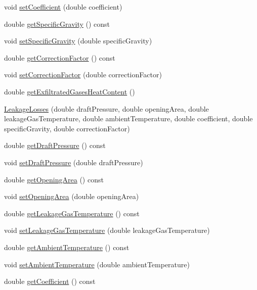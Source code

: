 \begin{DoxyCompactItemize}
void \hyperlink{class_leakage_losses_add2e96e75b6dd965370340dc03717434}{set\+Coefficient} (double coefficient)
\item 
double \hyperlink{class_leakage_losses_a37cd8c2282547246bab395424dad51d9}{get\+Specific\+Gravity} () const
\item 
void \hyperlink{class_leakage_losses_ab017828413655c5903374564e8718fac}{set\+Specific\+Gravity} (double specific\+Gravity)
\item 
double \hyperlink{class_leakage_losses_ad4f289a7490cd3fd4dfc4099fc4ad562}{get\+Correction\+Factor} () const
\item 
void \hyperlink{class_leakage_losses_a1af53750d5d9573dffa8674b3479e8d6}{set\+Correction\+Factor} (double correction\+Factor)
\item 
double \hyperlink{class_leakage_losses_a9663b916752bcf39a5482674e225e4a5}{get\+Exfiltrated\+Gases\+Heat\+Content} ()
\item 
\hyperlink{class_leakage_losses_ab29a3d7c9561d73f2530fc376b528510}{Leakage\+Losses} (double draft\+Pressure, double opening\+Area, double leakage\+Gas\+Temperature, double ambient\+Temperature, double coefficient, double specific\+Gravity, double correction\+Factor)
\item 
double \hyperlink{class_leakage_losses_a0ec89fc6371c4a788e1bb861c7cfba35}{get\+Draft\+Pressure} () const
\item 
void \hyperlink{class_leakage_losses_a33f31dc336fc6af0fd1e8c8739f37b1a}{set\+Draft\+Pressure} (double draft\+Pressure)
\item 
double \hyperlink{class_leakage_losses_a6b31fbefaa16a5a52ce423b9531e84fa}{get\+Opening\+Area} () const
\item 
void \hyperlink{class_leakage_losses_a417c9914af6b283695bdbd5e92451f9e}{set\+Opening\+Area} (double opening\+Area)
\item 
double \hyperlink{class_leakage_losses_a5dbb249c07bc91611b71d62610af7234}{get\+Leakage\+Gas\+Temperature} () const
\item 
void \hyperlink{class_leakage_losses_a379c88c8dea822636a1b9966e2408daa}{set\+Leakage\+Gas\+Temperature} (double leakage\+Gas\+Temperature)
\item 
double \hyperlink{class_leakage_losses_af67ad0af750484b13dd311c881f71c61}{get\+Ambient\+Temperature} () const
\item 
void \hyperlink{class_leakage_losses_aa6028111b3eb305d9ea6f9efea7c6c66}{set\+Ambient\+Temperature} (double ambient\+Temperature)
\item 
double \hyperlink{class_leakage_losses_a7f70af7175574e0c4447a322586ac01e}{get\+Coefficient} () const

\end{DoxyCompactItemize}
